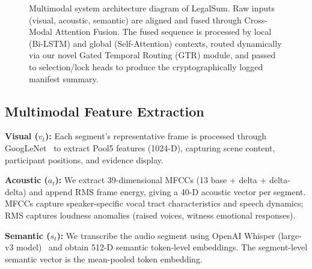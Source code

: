 \documentclass[letterpaper]{article} %
\begin{document}
\begin{figure}[t]
{
}
\caption{Multimodal system architecture diagram of LegalSum. Raw inputs (visual, acoustic, semantic) are aligned and fused through Cross-Modal Attention Fusion. The fused sequence is processed by local (Bi-LSTM) and global (Self-Attention) contexts, routed dynamically via our novel Gated Temporal Routing (GTR) module, and passed to selection/lock heads to produce the cryptographically logged manifest summary.}
\label{fig:architecture}
\end{figure}



\subsection{Multimodal Feature Extraction}

\textbf{Visual ($v_t$):} Each segment's representative frame is processed through GoogLeNet~\cite{gygli2014creating} to extract Pool5 features (1024-D), capturing scene content, participant positions, and evidence display.

\textbf{Acoustic ($a_t$):} We extract 39-dimensional MFCCs (13 base + delta + delta-delta) and append RMS frame energy, giving a 40-D acoustic vector per segment. MFCCs capture speaker-specific vocal tract characteristics and speech dynamics; RMS captures loudness anomalies (raised voices, witness emotional responses).

\textbf{Semantic ($s_t$):} We transcribe the audio segment using OpenAI Whisper (large-v3 model)~\cite{radford2023robust} and obtain 512-D semantic token-level embeddings. The segment-level semantic vector is the mean-pooled token embedding.
\end{document}
